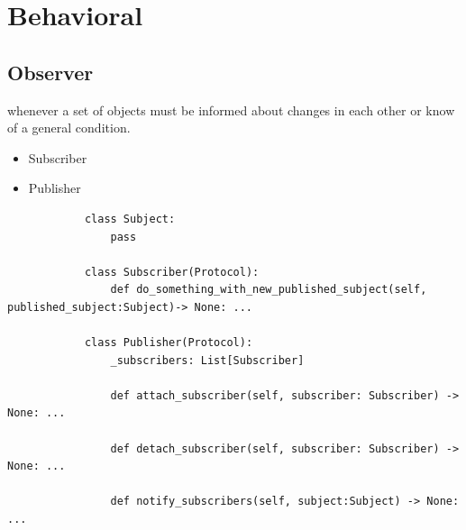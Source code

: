 \section{Behavioral}
    \subsection{Observer}
        whenever a set of objects must be informed about changes in each other or know of a general condition.
        \begin{itemize}
            \item Subscriber
            \item Publisher
        \end{itemize}
        \begin{verbatim}
            class Subject:
                pass
            
            class Subscriber(Protocol):
                def do_something_with_new_published_subject(self, published_subject:Subject)-> None: ...
            
            class Publisher(Protocol):
                _subscribers: List[Subscriber]
            
                def attach_subscriber(self, subscriber: Subscriber) -> None: ...
            
                def detach_subscriber(self, subscriber: Subscriber) -> None: ...
            
                def notify_subscribers(self, subject:Subject) -> None: ...
        \end{verbatim}